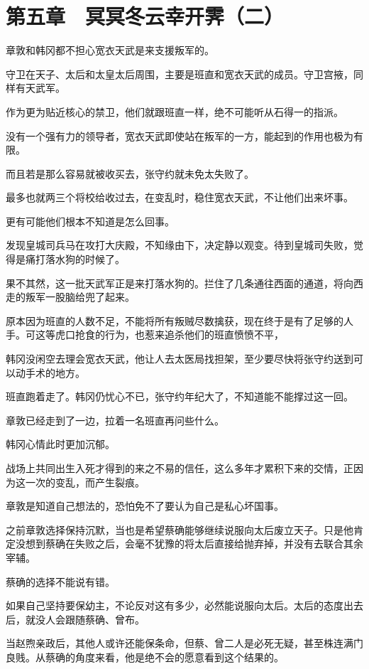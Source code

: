 \section{第五章　冥冥冬云幸开霁（二）}

章敦和韩冈都不担心宽衣天武是来支援叛军的。

守卫在天子、太后和太皇太后周围，主要是班直和宽衣天武的成员。守卫宫掖，同样有天武军。

作为更为贴近核心的禁卫，他们就跟班直一样，绝不可能听从石得一的指派。

没有一个强有力的领导者，宽衣天武即使站在叛军的一方，能起到的作用也极为有限。

而且若是那么容易就被收买去，张守约就未免太失败了。

最多也就两三个将校给收过去，在变乱时，稳住宽衣天武，不让他们出来坏事。

更有可能他们根本不知道是怎么回事。

发现皇城司兵马在攻打大庆殿，不知缘由下，决定静以观变。待到皇城司失败，觉得是痛打落水狗的时候了。

果不其然，这一批天武军正是来打落水狗的。拦住了几条通往西面的通道，将向西走的叛军一股脑给兜了起来。

原本因为班直的人数不足，不能将所有叛贼尽数擒获，现在终于是有了足够的人手。可这等虎口抢食的行为，也惹来追杀他们的班直愤愤不平，

韩冈没闲空去理会宽衣天武，他让人去太医局找担架，至少要尽快将张守约送到可以动手术的地方。

班直跑着走了。韩冈仍忧心不已，张守约年纪大了，不知道能不能撑过这一回。

章敦已经走到了一边，拉着一名班直再问些什么。

韩冈心情此时更加沉郁。

战场上共同出生入死才得到的来之不易的信任，这么多年才累积下来的交情，正因为这一次的变乱，而产生裂痕。

章敦是知道自己想法的，恐怕免不了要认为自己是私心坏国事。

之前章敦选择保持沉默，当也是希望蔡确能够继续说服向太后废立天子。只是他肯定没想到蔡确在失败之后，会毫不犹豫的将太后直接给抛弃掉，并没有去联合其余宰辅。

蔡确的选择不能说有错。

如果自己坚持要保幼主，不论反对这有多少，必然能说服向太后。太后的态度出去后，就没人会跟随蔡确、曾布。

当赵煦亲政后，其他人或许还能保条命，但蔡、曾二人是必死无疑，甚至株连满门良贱。从蔡确的角度来看，他是绝不会的愿意看到这个结果的。

